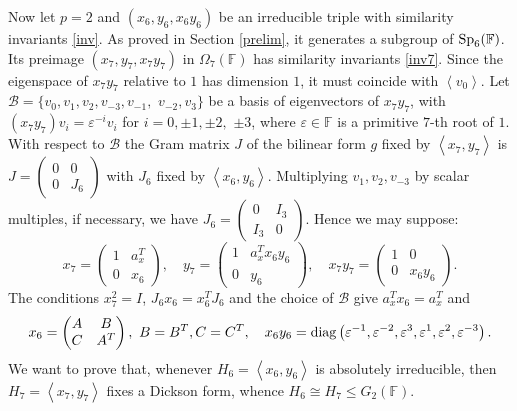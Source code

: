 \documentclass{amsart}
\theoremstyle{remark}
\begin{document}
Now let $p=2$ and $\left(x_6, y_6, x_6y_6\right)$ be an irreducible triple with similarity invariants  \eqref{inv}.
As proved in Section \ref{prelim},  it generates a subgroup of ${\mathop{\rm Sp}\nolimits}_6({\mathbb{F}})$. 
Its preimage $\left(x_7, y_7, x_7y_7\right)$ in $\Omega_{7}({\mathbb{F}})$ has
similarity invariants  \eqref{inv7}. Since the eigenspace of $x_7y_7$ relative to $1$ has dimension 
$1$, it must coincide with $\left\langle v_0\right\rangle$. Let 
$\mathcal{B}=\{v_0, v_1, v_2,v_{-3}, v_{-1},$ $v_{-2}, v_{3}\}$ be a basis  of 
eigenvectors of $x_7y_7$, with $(x_7y_7)v_i={\varepsilon}^{-i}v_i$ for $i=0,\pm 1, \pm 2,$ $\pm 3$,
where ${\varepsilon}\in {\mathbb{F}}$ is a primitive $7$-th root of $1$.
With respect to $\mathcal{B}$ the Gram matrix $J$
of the bilinear form $g$ fixed by $\left\langle x_7,y_7\right\rangle$ is
$J=\begin{pmatrix} 0& 0\\0&J_6\end{pmatrix}$ with $J_6$ fixed
by $\left\langle x_6,y_6\right\rangle$. 
Multiplying $v_1,v_2, v_{-3}$ by scalar multiples, if necessary, 
we have $J_6=\begin{pmatrix} 0& I_3\\I_3&0\end{pmatrix}$.
Hence we may suppose:
\begin{equation}\label{shape7}
x_7=\begin{pmatrix} 1 & a_{x}^T \\ 0 &  x_6  \end{pmatrix}, \quad y_7 =
\begin{pmatrix} 1 &a_{x}^T x_6y_6\\
 0 &  y_6  \end{pmatrix},\quad 
x_7y_7 =\begin{pmatrix} 1 &
0\\ 0 &  x_6y_6  \end{pmatrix} .
\end{equation}
The conditions $x_7^2=I$, $J_6x_6=x_6^TJ_6$ and the choice of $\mathcal{B}$ give $a_{x}^Tx_6=a_{x}^T$ and 
\begin{equation}\label{shapex6}
x_6=
\begin{pmatrix} A &B\\
C&A^T \end{pmatrix},\ B=B^T, C=C^T, \quad  x_6y_6= {\mathop{\rm diag}\nolimits}\left({\varepsilon}^{-1},{\varepsilon}^{-2},{\varepsilon}^{3},{\varepsilon}^{1},{\varepsilon}^{2},{\varepsilon}^{-3} \right).
\end{equation}
We want to prove that, whenever $H_6=\left\langle x_6,y_6\right\rangle$ is absolutely
irreducible,
then $H_7=\left\langle x_7,y_7\right\rangle$ fixes a Dickson form, whence $ H_6\cong
H_7\leq G_2({\mathbb{F}})$. 
\end{document}
